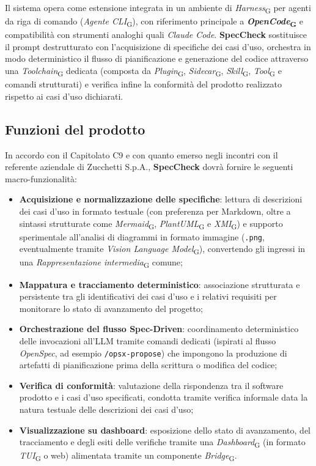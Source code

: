 \documentclass[11pt, a4paper]{article}
\newcommand{\glossario}[1]{\textit{#1}\textsubscript{G}}
\begin{document}
Il sistema opera come estensione integrata in un ambiente di \glossario{Harness} per agenti da riga di comando (\glossario{Agente CLI}), con riferimento principale a \textbf{\glossario{OpenCode}} e compatibilità con strumenti analoghi quali \textit{Claude Code}. \textbf{SpecCheck} sostituisce il prompt destrutturato con l'acquisizione di specifiche dei casi d'uso, orchestra in modo deterministico il flusso di pianificazione e generazione del codice attraverso una \glossario{Toolchain} dedicata (composta da \glossario{Plugin}, \glossario{Sidecar}, \glossario{Skill}, \glossario{Tool} e comandi strutturati) e verifica infine la conformità del prodotto realizzato rispetto ai casi d'uso dichiarati.

\subsection{Funzioni del prodotto}
In accordo con il Capitolato C9 e con quanto emerso negli incontri con il referente aziendale di Zucchetti S.p.A., \textbf{SpecCheck} dovrà fornire le seguenti macro-funzionalità:
\begin{itemize}
    \item \textbf{Acquisizione e normalizzazione delle specifiche}: lettura di descrizioni dei casi d'uso in formato testuale (con preferenza per Markdown, oltre a sintassi strutturate come \glossario{Mermaid}, \glossario{PlantUML} e \glossario{XMI}) e supporto sperimentale all'analisi di diagrammi in formato immagine (\texttt{.png}, eventualmente tramite \glossario{Vision Language Model}), convertendo gli ingressi in una \glossario{Rappresentazione intermedia} comune;
    \item \textbf{Mappatura e tracciamento deterministico}: associazione strutturata e persistente tra gli identificativi dei casi d'uso e i relativi requisiti per monitorare lo stato di avanzamento del progetto;
    \item \textbf{Orchestrazione del flusso Spec-Driven}: coordinamento deterministico delle invocazioni all'LLM tramite comandi dedicati (ispirati al flusso \textit{OpenSpec}, ad esempio \texttt{/\allowbreak opsx-propose}) che impongono la produzione di artefatti di pianificazione prima della scrittura o modifica del codice;
    \item \textbf{Verifica di conformità}: valutazione della rispondenza tra il software prodotto e i casi d'uso specificati, condotta tramite verifica informale data la natura testuale delle descrizioni dei casi d'uso;
    \item \textbf{Visualizzazione su dashboard}: esposizione dello stato di avanzamento, del tracciamento e degli esiti delle verifiche tramite una \glossario{Dashboard} (in formato \glossario{TUI} o web) alimentata tramite un componente \glossario{Bridge}.
\end{itemize}
\end{document}
